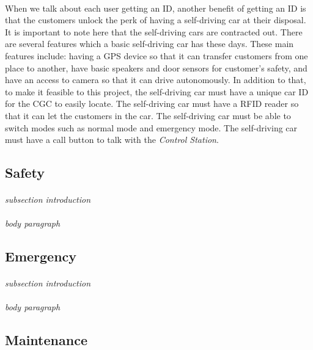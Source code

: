 \documentclass[12pt]{article}
\begin{document}
	\paragraph{} When we talk about each user getting an ID, another benefit of getting an 
	ID is that the customers unlock the perk of having a self-driving car at their disposal. 
	It is important to note here that the self-driving cars are contracted out. There are 
	several features which a basic self-driving car has these days. These main features 
	include: having a GPS device so that it can transfer customers from one place to another, 
	have basic speakers and door sensors for customer's safety, and have an access to camera 
	so that it can drive autonomously. In addition to that, to make it feasible to this project,
	the self-driving car must have a unique car ID for the CGC to easily locate. The self-driving 
	car must have a RFID reader so that it can let the customers in the car. The self-driving car 
	must be able to switch modes such as normal mode and emergency mode. The self-driving car must
	 have a call button to talk with the \textit{Control Station}.
	
	\subsection{Safety}
	\paragraph{} \textit{subsection introduction}
	\paragraph{} \textit{body paragraph}

	\subsection{Emergency}
	\paragraph{} \textit{subsection introduction}
	\paragraph{} \textit{body paragraph}
	
	\subsection{Maintenance}
\end{document}
